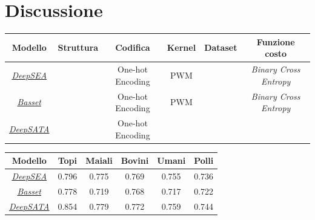 
\chapter{Discussione}\label{chp:discussion}



\begin{table}[!h]
    \centering
    \renewcommand{\arraystretch}{2}
    \begin{tabular}{|c|c|c|c|c|c|} %
        \hline %
        \textbf{Modello} & \textbf{Struttura} & \textbf{Codifica} & \textbf{Kernel} & \textbf{Dataset} & \textbf{Funzione costo}\\ 
        \hline\hline %
        \hyperref[sec:DeepSEA]{\textsl{DeepSEA}} & & One-hot Encoding & \acs{PWM} & & \textsl{Binary Cross Entropy} \\ 
        \hyperref[sec:Basset]{\textsl{Basset}} & & One-hot Encoding & \acs{PWM} & & \textsl{Binary Cross Entropy} \\ 
        \hyperref[sec:DeepSATA]{\textsl{DeepSATA}} & & One-hot Encoding & & &  \\ 
        \hline
    \end{tabular}
    \renewcommand{\arraystretch}{1}
\end{table}




\begin{table}[!h]
    \centering
    \renewcommand{\arraystretch}{2}
    \begin{tabular}{|c|c|c|c|c|c|} %
        \hline %
        \textbf{Modello} & \textbf{Topi} & \textbf{Maiali} & \textbf{Bovini} & \textbf{Umani} & \textbf{Polli}\\ 
        \hline\hline %
        \hyperref[sec:DeepSEA]{\textsl{DeepSEA}} & 0.796 & 0.775 & 0.769 & 0.755 & 0.736 \\ 
        \hyperref[sec:Basset]{\textsl{Basset}} & 0.778 & 0.719 & 0.768 & 0.717 & 0.722 \\ 
        \hyperref[sec:DeepSATA]{\textsl{DeepSATA}} & 0.854 & 0.779 & 0.772 & 0.759 & 0.744 \\ 
        \hline
    \end{tabular}
    \renewcommand{\arraystretch}{1}
\end{table}

